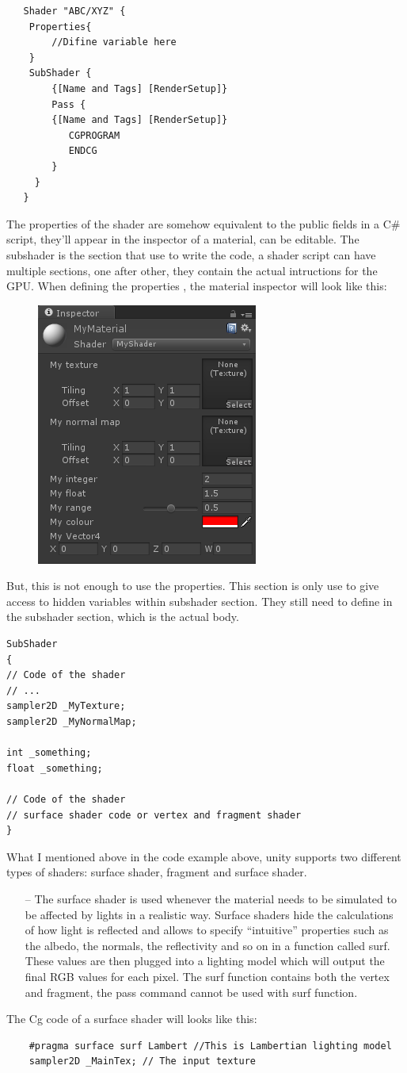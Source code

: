 \documentclass[a4paper, 13pt]{extarticle}
\begin{document}
{   \begin{lstlisting}
   Shader "ABC/XYZ" {
   	Properties{
   		//Difine variable here	
   	}
   	SubShader {
   		{[Name and Tags] [RenderSetup]}
   		Pass {
   		{[Name and Tags] [RenderSetup]}
		   CGPROGRAM
		   ENDCG
   		}
  	 }
   }
   \end{lstlisting}
  The properties of the shader are somehow equivalent to the public fields in a C\# script, they'll appear in the inspector of a material, can be editable. The subshader is the section that use to write the code, a shader script can have multiple sections, one after other, they contain the actual intructions for the GPU. When defining the properties , the material inspector will look like this: 
   \begin{figure}[h]
  	\begin{minipage}{1\textwidth}
  		\centering
  		\includegraphics[width=0.2\linewidth]{intructions/Inspector_material.png}
  		\centering
  	\end{minipage}
  \end{figure}
But, this is not enough to use the properties. This section is only use to give access to hidden variables within subshader section. They still need to define in the subshader section, which is the actual body. 
\begin{lstlisting}
SubShader
{
// Code of the shader
// ...
sampler2D _MyTexture;
sampler2D _MyNormalMap;

int _something;
float _something;

// Code of the shader
// surface shader code or vertex and fragment shader
}
\end{lstlisting}
What I mentioned above in the code example above, unity supports two different types of shaders: surface shader, fragment and surface shader.
\begin{itemize}
	\item[--] The surface shader is used whenever the material needs to be simulated to be affected by lights in a realistic way. Surface shaders hide the calculations of how light is reflected and allows to specify “intuitive” properties such as the albedo, the normals, the reflectivity and so on in a function called surf. These values are then plugged into a lighting model which will output the final RGB values for each pixel. The surf function contains both the vertex and fragment, the pass command cannot be used with surf function.
\end{itemize}
 	The Cg code of a surface shader will looks like this: 
 	\begin{lstlisting}
 	#pragma surface surf Lambert //This is Lambertian lighting model
 	sampler2D _MainTex; // The input texture
 	

\end{lstlisting}}
\end{document}
